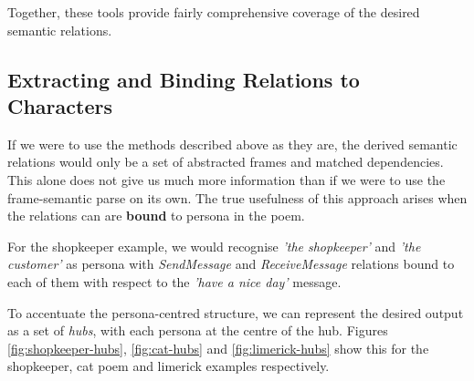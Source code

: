 Together, these tools provide fairly comprehensive coverage of the desired semantic relations.


\subsection{Extracting and Binding Relations to Characters}

If we were to use the methods described above as they are, the derived semantic relations would only be a set of abstracted frames and matched dependencies. This alone does not give us much more information than if we were to use the frame-semantic parse on its own. The true usefulness of this approach arises when the relations can are \textbf{bound} to persona in the poem. 

For the shopkeeper example, we would recognise \textit{'the shopkeeper'} and \textit{'the customer'} as persona with \textit{SendMessage} and \textit{ReceiveMessage} relations bound to each of them with respect to the \textit{'have a nice day'} message.

To accentuate the persona-centred structure, we can represent the desired output as a set of \textit{hubs}, with each persona at the centre of the hub. Figures \ref{fig:shopkeeper-hubs}, \ref{fig:cat-hubs} and \ref{fig:limerick-hubs} show this for the shopkeeper, cat poem and limerick examples respectively. 


